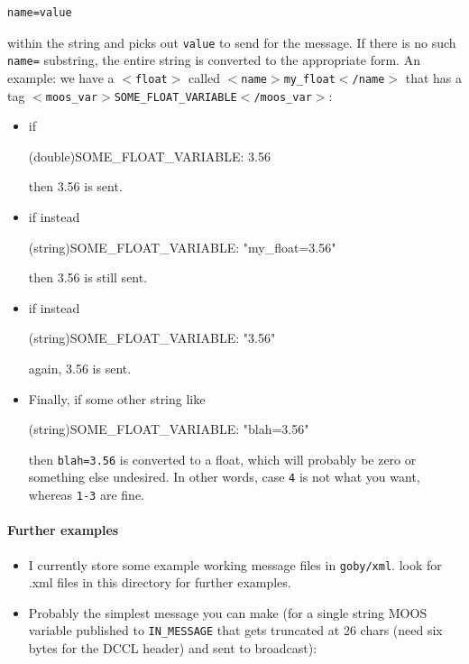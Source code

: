 \documentclass[11pt, letterpaper, oneside]{memoir}
\newcommand{\xmltag}[1]{\texttt{$<$#1$>$}}
\begin{document}
\begin{itemize}
\begin{verbatim}
name=value
\end{verbatim}
within the string and picks out \verb|value| to send for the message. If there is no such \verb|name=| substring, the entire string is converted to the appropriate form. An example: we have a \xmltag{float} called \xmltag{name$>$my\_float$<$/name} that has a tag \xmltag{moos\_var$>$SOME\_FLOAT\_VARIABLE$<$/moos\_var}: 
\begin{itemize}
\item if
\begin{boxedverbatim}
(double)SOME_FLOAT_VARIABLE: 3.56
\end{boxedverbatim}
then 3.56 is sent.
\item if instead 
\begin{boxedverbatim}
(string)SOME_FLOAT_VARIABLE: "my_float=3.56"
\end{boxedverbatim}
then 3.56 is still sent.
\item if instead
\begin{boxedverbatim}
(string)SOME_FLOAT_VARIABLE: "3.56"
\end{boxedverbatim}
again, 3.56 is sent.
\item Finally, if some other string like
\begin{boxedverbatim}
(string)SOME_FLOAT_VARIABLE: "blah=3.56"
\end{boxedverbatim}
\resetbvlinenumber
then \verb|blah=3.56| is converted to a float, which will probably be zero or something else undesired. In other words, case \verb|4| is not what you want, whereas \verb|1-3| are fine.
\end{itemize}
\end{itemize}
\paragraph{Further examples} \label{sec:ex}
\begin{itemize}
\item I currently store some example working message files in \verb|goby/xml|. look for .xml files in this directory for further examples.
\item Probably the simplest message you can make (for a single string MOOS variable published to \verb|IN_MESSAGE| that gets truncated at 26 chars (need six bytes for the DCCL header) and sent to broadcast):
\resetbvlinenumber
\end{itemize}
\end{document}

